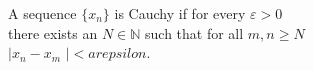 \documentclass[preview]{standalone}
\begin{document}
\begin{center}
A sequence $\{x_n\}$ is Cauchy if for every $\varepsilon > 0$\\there exists an $N \in \mathbb{N}$ such that for all $m, n \geq N$\\$|$$x_n - x_m$ $|$$ < arepsilon$.
\end{center}
\end{document}
